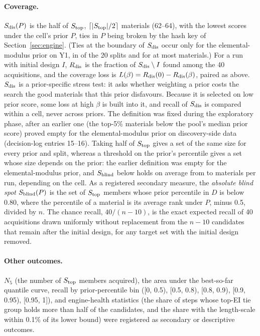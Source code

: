 \paragraph{Coverage.} $S_{\mathrm{dis}}(P)$ is the half of $S_{\mathrm{top}}$, $\lceil|S_{\mathrm{top}}|/2\rceil$ materials (62--64), with the lowest scores under
the cell's prior $P$, ties in $P$ being broken by the hash key of Section~\ref{sec:engine}. (Ties at the boundary of $S_{\mathrm{dis}}$ occur
only for the elemental-modulus prior on Y1, in  of the 20 splits and for at most
 materials.) For a run with initial design $I$, $R_{\mathrm{dis}}$ is the fraction of $S_{\mathrm{dis}}\setminus I$ found among the 40
acquisitions, and the coverage loss is $L(\beta)=R_{\mathrm{dis}}(0)-R_{\mathrm{dis}}(\beta)$, paired as above. $S_{\mathrm{dis}}$ is a prior-specific stress
test: it asks whether weighting a prior costs the search the good materials that this prior disfavours. Because it is selected on
low prior score, some loss at high $\beta$ is built into it, and recall of $S_{\mathrm{dis}}$ is compared within a cell, never across priors.
The definition was fixed during the exploratory phase, after an earlier one (the top-5\% materials below the pool's median prior
score) proved empty for the elemental-modulus prior on discovery-side data (decision-log entries 15--16). Taking half of $S_{\mathrm{top}}$ gives
a set of the same size for every prior and split, whereas a threshold on the prior's percentile gives a set whose size depends on
the prior: the earlier definition was empty for the elemental-modulus prior, and $S_{\mathrm{blind}}$ below holds on average from
 to  materials per
run, depending on the cell.
As a registered secondary measure, the \emph{absolute blind spot} $S_{\mathrm{blind}}(P)$ is the set of $S_{\mathrm{top}}$ members whose prior percentile in $D$ is below 0.80, where the
percentile of a material is its average rank under $P$, minus 0.5, divided by $n$. The chance recall, $40/(n-10)$, is the exact expected recall of 40 acquisitions drawn uniformly
without replacement from the $n-10$ candidates that remain after the initial design, for any target set with the initial design
removed.

\paragraph{Other outcomes.} $N_5$ (the number of $S_{\mathrm{top}}$ members acquired), the area under the best-so-far quantile curve,
recall by prior-percentile bin ([0, 0.5), [0.5, 0.8), [0.8, 0.9), [0.9, 0.95), [0.95, 1]), and engine-health statistics (the share
of steps whose top-EI tie group holds more than half of the candidates, and the share with the length-scale within 0.1\% of its
lower bound) were registered as secondary or descriptive outcomes.

